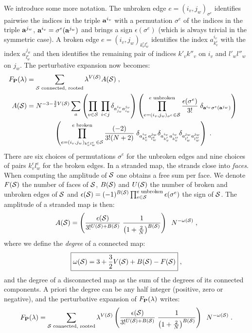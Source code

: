\documentclass[10pt]{article}
\theoremstyle{plain}
\theoremstyle{definition}
\newcommand{\bP}{ {\bf P} }
\newcommand{\ba}{ {\bf a} }
\newcommand{\cS}{{\cal S}}
\newcommand{\be}{\begin{equation}}
\newcommand{\ee}{\end{equation}}
\begin{document}
 We introduce some more notation. The unbroken edge $e = (i_v,j_w)_{\sigma^e}$ identifies pairwise the indices in the triple $\ba^{i_v}$ with a permutation $\sigma^e$ of the indices in the triple
 $\ba^{j_w}$,  $  \ba^{i_v} = \sigma^e(\ba^{j_w}  )$
 and brings a sign $\epsilon(\sigma^e)$ (which is always trivial in the symmetric case). A broken edge 
 $e = (i_v,j_w)_{k^e_v l^e_w}$
 identifies the index $a^{i_v}_{k^e_v }$ with the index $a^{j_w}_{l^e_w }$ and then identifies the 
 remaining pair of indices $k'_vk''_v$ on $i_v$ and $l'_wl''_w$ on $j_w$. The perturbative expansion now becomes:
\begin{align*}
 F_{\bP}(\lambda) & = \sum_{ \cS  \text{ connected, rooted} } \lambda^{ V (\cS)} A( \cS ) \;,  \crcr
 A(\cS) & = N^{ -3 -\frac{3}{2} V(\cS) }\sum_{  a } \left( \prod_{v\in \cS} \;  \prod_{  i<j } \delta_{a^{i_v}_{j_v} a^{j_v}_{i_v } } \right) 
\left(   \prod_{e = (i_v,j_w)_{\sigma^e} \in \cS}^{e \text{ unbroken}}  \frac{\epsilon(\sigma^e ) }{3!}  \; \delta_{   \ba^{i_v}  \sigma^e(\ba^{j_w}  )    }  \right) \crcr
& \qquad \qquad \left(  \prod_{e = (i_v,j_w)_{k^e_vl^e_w} \in \cS}^{e \text{ broken}}  \frac{ (- 2) }{ 3! (N+2) } \; \delta_{ a^{i_v}_{k^e_v} a^{j_w}_{l^e_w } } 
\delta_{ a^{i_v}_{k'_v} a^{i_v}_{ k''_v }} \delta_{ a^{j_w}_{l'_w} a^{j_w}_{l''_w}}   \right) \;.
\end{align*}
There are six choices of permutations $\sigma^e$ for the unbroken edges and nine choices of pairs $k^e_vl^e_w$ for the broken edges.
In a stranded map, the strands close into \emph{faces}. When computing the amplitude of $\cS$ 
one obtains a free sum per face.
We denote $F(\cS)$ the number of faces of $\cS$, $B(\cS)$ and $U(\cS)$ the number of broken and unbroken edges of $\cS$
and $ \epsilon(\cS) = (-1)^{ B(\cS) } \prod_{e\in \cS}^{e \text{ unbroken}} \epsilon(\sigma^e)  $ the sign of $\cS$. The amplitude of a stranded map is then:
\[
 A(\cS)  =  \left(  \frac{  \epsilon(\cS)  }{3!^{U(\cS) + B(\cS) } } \; \frac{ 1 }{ \left(  1 + \frac{2}{N} \right)^{ B(\cS)} }  \right) \; \; N^{  - \omega(\cS)} \;, 
\]
where we define the \emph{degree} of a connected map:
\be \label{eq:degree}
\boxed{ \omega(\cS) = 3 +  \frac{3}{2} V(\cS)  + B(\cS) - F(\cS)  } \;,
\ee
and the degree of a disconnected map as the sum of the degrees of its connected components. 
A priori the degree can be any half integer (positive, zero or negative), and the perturbative expansion of 
$F_{\bP}(\lambda)$ writes:
 \be\label{eq:perte1}
 F_{\bP}(\lambda)  = \sum_{ \cS  \text{ connected, rooted} } \lambda^{ V (\cS)} \left(  \frac{  \epsilon(\cS)  }{3!^{U(\cS) + B(\cS) } } \; \frac{ 1 }{ \left(  1 + \frac{2}{N} \right)^{ B(\cS)} }  \right)
 \; \; N^{  - \omega(\cS)} \;.
\ee
\end{document}
